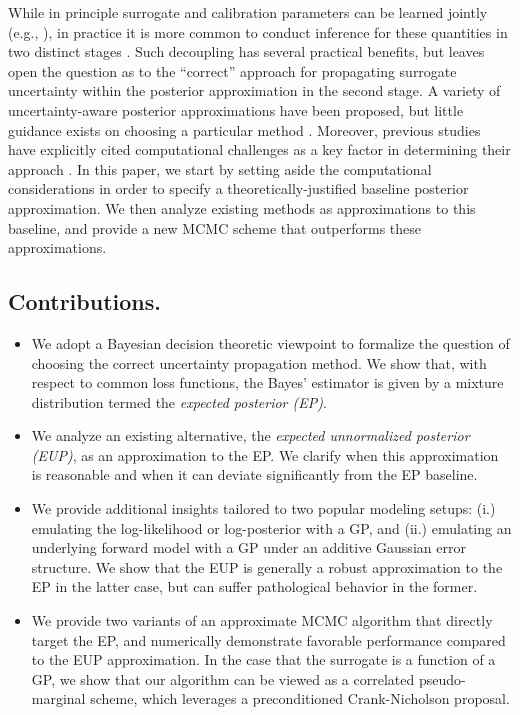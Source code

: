 \documentclass[12pt]{article}
\begin{document}
While in principle surrogate and calibration parameters can be learned 
jointly (e.g., \citet{KOH}), in practice it is more common to conduct inference 
for these quantities in two distinct stages \citep{modularization,PlummerCut}.
Such decoupling has several practical benefits, but leaves open the 
question as to the ``correct'' approach for propagating surrogate uncertainty 
within the posterior approximation in the second stage.
A variety of uncertainty-aware posterior 
approximations have been proposed, but little guidance exists on choosing a particular 
method \citep{reviewPaper,BilionisBayesSurrogates,StuartTeck1,VehtariParallelGP,
BurknerSurrogate,BurknerTwoStep,FerEmulation}. Moreover, previous studies have 
explicitly cited computational challenges as a key factor in determining their 
approach \citep{VehtariParallelGP,StuartTeck2}. In this paper, we start by setting 
aside the computational considerations in order to specify a theoretically-justified 
baseline posterior approximation. We then analyze existing methods as 
approximations to this baseline, and provide a new MCMC scheme that outperforms 
these approximations. 

\subsection{Contributions.}
\begin{itemize}
\item We adopt a Bayesian decision theoretic viewpoint to formalize the question of 
choosing the correct uncertainty propagation method. We show that, with respect 
to common loss functions, the Bayes' estimator is given by a mixture distribution 
termed the \textit{expected posterior (EP)}.
\item We analyze an existing alternative, the \textit{expected unnormalized posterior (EUP)},
as an approximation to the EP. We clarify when this approximation is reasonable and 
when it can deviate significantly from the EP baseline.
\item We provide additional insights tailored to two popular modeling setups: 
(i.) emulating the log-likelihood or log-posterior with a GP, and (ii.) emulating an 
underlying forward model with a GP under an additive Gaussian error structure. 
We show that the EUP is generally a robust approximation to the EP in 
the latter case, but can suffer pathological behavior in the former.
\item We provide two variants of an approximate MCMC algorithm that directly 
target the EP, and numerically demonstrate favorable performance compared 
to the EUP approximation. In the case that the surrogate is a function of a GP, we 
show that our algorithm can be viewed as a correlated pseudo-marginal scheme,
which leverages a preconditioned Crank-Nicholson proposal.
\end{itemize}
\end{document}
